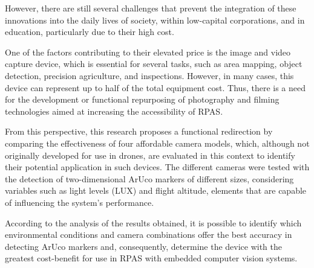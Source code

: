 \documentclass[letterpaper]{article}
\begin{document}
However, there are still several challenges that prevent the integration of these innovations into the daily lives of society, within low-capital corporations, and in education, particularly due to their high cost.

One of the factors contributing to their elevated price is the image and video capture device, which is essential for several tasks, such as area mapping, object detection, precision agriculture, and inspections. However, in many cases, this device can represent up to half of the total equipment cost. Thus, there is a need for the development or functional repurposing of photography and filming technologies aimed at increasing the accessibility of RPAS.

From this perspective, this research proposes a functional redirection by comparing the effectiveness of four affordable camera models, which, although not originally developed for use in drones, are evaluated in this context to identify their potential application in such devices. The different cameras were tested with the detection of two-dimensional ArUco markers of different sizes, considering variables such as light levels (LUX) and flight altitude, elements that are capable of influencing the system's performance.

According to the analysis of the results obtained, it is possible to identify which environmental conditions and camera combinations offer the best accuracy in detecting ArUco markers and, consequently, determine the device with the greatest cost-benefit for use in RPAS with embedded computer vision systems.


\end{document}
